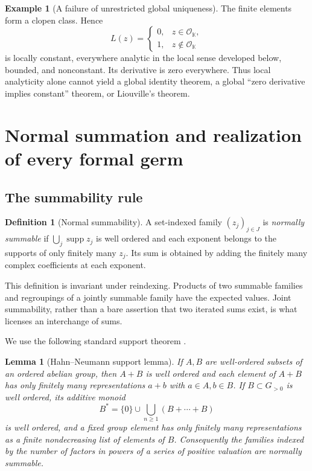 \documentclass[11pt,letterpaper]{article}
\numberwithin{equation}{section}
\newtheorem{lemma}[lemma]{Lemma}
\theoremstyle{definition}
\newtheorem{definition}[definition]{Definition}
\newtheorem{example}[example]{Example}
\theoremstyle{remark}
\newcommand{\K}{\mathbb K}
\newcommand{\OO}{\mathcal O}
\DeclareMathOperator{\supp}{supp}
\begin{document}
\begin{example}[A failure of unrestricted global uniqueness]
The finite elements form a clopen class. Hence
\begin{equation}\label{eq:locallyconstant}
 L(z)=\begin{cases}0,&z\in\OO_\K,\\1,&z\notin\OO_\K\end{cases}
\end{equation}
is locally constant, everywhere analytic in the local sense developed
below, bounded, and nonconstant. Its derivative is zero everywhere. Thus
local analyticity alone cannot yield a global identity theorem, a global
``zero derivative implies constant'' theorem, or Liouville's theorem.
\end{example}

\section{Normal summation and realization of every formal germ}
\label{sec:sums}

\subsection{The summability rule}

\begin{definition}[Normal summability]\label{def:summable}
A set-indexed family $(z_j)_{j\in J}$ is \emph{normally summable} if
$\bigcup_j\supp z_j$ is well ordered and each exponent belongs to the
supports of only finitely many $z_j$. Its sum is obtained by adding the
finitely many complex coefficients at each exponent.
\end{definition}

This definition is invariant under reindexing. Products of two summable
families and regroupings of a jointly summable family have the expected
values. Joint summability, rather than a bare assertion that two iterated
sums exist, is what licenses an interchange of sums.

We use the following standard support theorem \cite{Neumann}.

\begin{lemma}[Hahn--Neumann support lemma]\label{lem:neumann}
If $A,B$ are well-ordered subsets of an ordered abelian group, then $A+B$
is well ordered and each element of $A+B$ has only finitely many
representations $a+b$ with $a\in A,b\in B$.
If $B\subset G_{>0}$ is well ordered, its additive monoid
\[
 B^*=\{0\}\cup\bigcup_{n\ge1}(B+\cdots+B)
\]
is well ordered, and a fixed group element has only finitely many
representations as a finite nondecreasing list of elements of $B$.
Consequently the families indexed by the number of factors in powers of
a series of positive valuation are normally summable.
\end{lemma}
\end{document}

